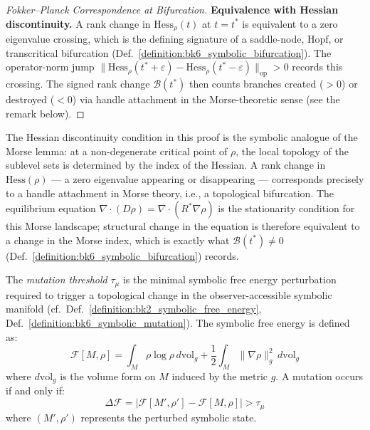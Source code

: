 \begin{theorem}
\begin{proof}[Fokker--Planck Correspondence at Bifurcation]
\textbf{Equivalence with Hessian discontinuity.}
A rank change in $\text{Hess}_\rho(t)$ at $t = t^*$ is equivalent to a zero eigenvalue
crossing, which is the defining signature of a saddle-node, Hopf, or transcritical
bifurcation (Def.~\ref{definition:bk6_symbolic_bifurcation}). The operator-norm jump
$\|\text{Hess}_\rho(t^*{+}\varepsilon) - \text{Hess}_\rho(t^*{-}\varepsilon)\|_{\text{op}}
> 0$ records this crossing. The signed rank change $\mathcal{B}(t^*)$ then counts
branches created ($>0$) or destroyed ($<0$) via handle attachment in the Morse-theoretic
sense (see the remark below).
\end{proof}
\begin{remark}
The Hessian discontinuity condition in this proof is the symbolic analogue of the Morse lemma: at a non-degenerate critical point of $\rho$, the local topology of the sublevel sets is determined by the index of the Hessian. A rank change in $\text{Hess}(\rho)$ — a zero eigenvalue appearing or disappearing — corresponds precisely to a handle attachment in Morse theory, i.e., a topological bifurcation. The equilibrium equation $\nabla \cdot (D\rho) = \nabla \cdot (R^* \nabla \rho)$ is the stationarity condition for this Morse landscape; structural change in the equation is therefore equivalent to a change in the Morse index, which is exactly what $\mathcal{B}(t^*) \neq 0$ (Def.~\ref{definition:bk6_symbolic_bifurcation}) records.
\end{remark}
\end{theorem}
\begin{definition}
\label{definition:bk6_mutation_threshold}
The \emph{mutation threshold} $\tau_\mu$ is the minimal symbolic free energy perturbation required to trigger a topological change in the observer-accessible symbolic manifold (cf.~Def.~\ref{definition:bk2_symbolic_free_energy}, Def.~\ref{definition:bk6_symbolic_mutation}). The symbolic free energy is defined as:
\begin{equation}
\mathcal{F}[M, \rho] = \int_M \rho \log \rho \, d\text{vol}_g + \frac{1}{2}\int_M \|\nabla \rho\|_g^2 \, d\text{vol}_g
\end{equation}
where $d\text{vol}_g$ is the volume form on $M$ induced by the metric $g$.
A mutation occurs if and only if:
\begin{equation}
\Delta \mathcal{F} = |\mathcal{F}[M', \rho'] - \mathcal{F}[M, \rho]| > \tau_\mu
\end{equation}
where $(M', \rho')$ represents the perturbed symbolic state.
\end{definition}

